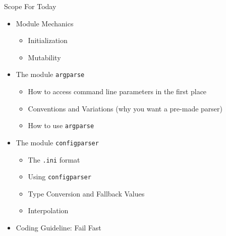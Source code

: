 \begin{frame}{Scope For Today}
%
\begin{itemize}
\item Module Mechanics
	\begin{itemize}
	\item Initialization
	\item Mutability
	\end{itemize}
\item The module \texttt{argparse}
	\begin{itemize}
	\item How to access command line parameters in the first place
	\item Conventions and Variations (why you want a pre-made parser)
	\item How to use \texttt{argparse}
	\end{itemize}
\item The module \texttt{configparser}
	\begin{itemize}
	\item The \texttt{.ini} format
	\item Using \texttt{configparser}
	\item Type Conversion and Fallback Values
	\item Interpolation
	\end{itemize}
\item Coding Guideline: Fail Fast
\end{itemize}
%
\end{frame}


